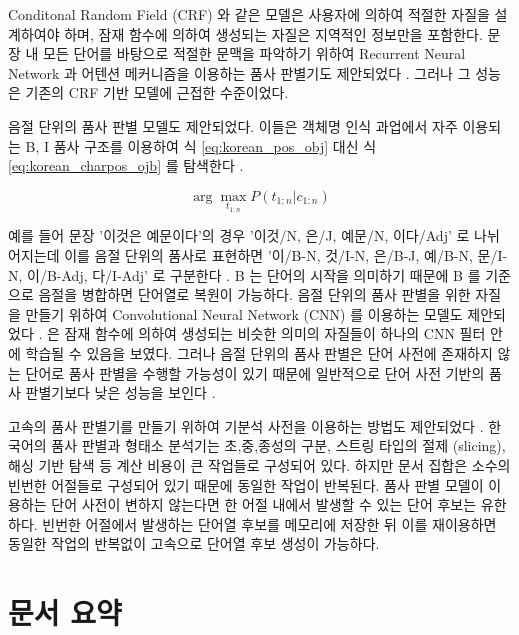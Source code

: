 \documentclass[oneside, ko,phd]{snuthesis_utf8_kor}
\begin{document}
Conditonal Random Field (CRF) 와 같은 모델은 사용자에 의하여 적절한 자질을 설계하여야 하며, 잠재 함수에 의하여 생성되는 자질은 지역적인 정보만을 포함한다.
문장 내 모든 단어를 바탕으로 적절한 문맥을 파악하기 위하여 Recurrent Neural Network 과 어텐션 메커니즘을 이용하는 품사 판별기도 제안되었다 \cite{lee2016sequence}.
그러나 그 성능은 기존의 CRF 기반 모델에 근접한 수준이었다.


음절 단위의 품사 판별 모델도 제안되었다.
이들은 객체명 인식 과업에서 자주 이용되는 B, I 품사 구조를 이용하여 식 \ref{eq:korean_pos_obj} 대신 식 \ref{eq:korean_charpos_ojb} 를 탐색한다 \cite{zhao2006improved}.

\begin{equation}
\label{eq:korean_charpos_ojb}
\arg \max_{t_{1:n}} P(t_{1:n} \vert c_{1:n})
\end{equation}

예를 들어 문장 '이것은 예문이다'의 경우 '이것/N, 은/J, 예문/N, 이다/Adj' 로 나뉘어지는데 이를 음절 단위의 품사로 표현하면 '이/B-N, 것/I-N, 은/B-J, 예/B-N, 문/I-N, 이/B-Adj, 다/I-Adj' 로 구분한다 \cite{shim2004syllablekor, shim2011morpheme, kim2018bidirectional}.
B 는 단어의 시작을 의미하기 때문에 B 를 기준으로 음절을 병합하면 단어열로 복원이 가능하다.
음절 단위의 품사 판별을 위한 자질을 만들기 위하여 Convolutional Neural Network (CNN) 를 이용하는 모델도 제안되었다 \cite{kakao2018pos}.
\cite{kakao2018pos} 은 잠재 함수에 의하여 생성되는 비슷한 의미의 자질들이 하나의 CNN 필터 안에 학습될 수 있음을 보였다.
그러나 음절 단위의 품사 판별은 단어 사전에 존재하지 않는 단어로 품사 판별을 수행할 가능성이 있기 때문에 일반적으로 단어 사전 기반의 품사 판별기보다 낮은 성능을 보인다 \cite{ng2004chinese, shi2007dual, zhang2008joint, lee2016sequence, kakao2018pos}.

고속의 품사 판별기를 만들기 위하여 기분석 사전을 이용하는 방법도 제안되었다 \cite{lee2016preanalyzed, shim2016preanalyzed}.
한국어의 품사 판별과 형태소 분석기는 초,중,종성의 구분, 스트링 타입의 절제 (slicing), 해싱 기반 탐색 등 계산 비용이 큰 작업들로 구성되어 있다.
하지만 문서 집합은 소수의 빈번한 어절들로 구성되어 있기 때문에 동일한 작업이 반복된다.
품사 판별 모델이 이용하는 단어 사전이 변하지 않는다면 한 어절 내에서 발생할 수 있는 단어 후보는 유한하다.
빈번한 어절에서 발생하는 단어열 후보를 메모리에 저장한 뒤 이를 재이용하면 동일한 작업의 반복없이 고속으로 단어열 후보 생성이 가능하다.

\section{문서 요약}
\end{document}
